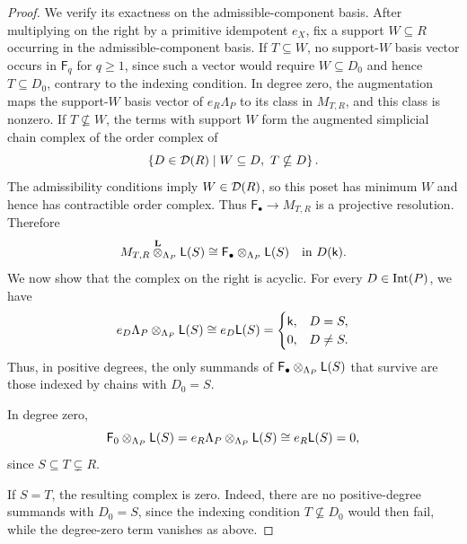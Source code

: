 \begin{proof}
We verify its exactness on the admissible-component basis.
After multiplying on the right by a primitive idempotent $e_X$, fix
a support $W\subseteq R$ occurring in the admissible-component basis.
If $T\subseteq W$, no support-$W$ basis vector occurs in
$\mathsf F_q$ for $q\geq1$, since such a vector would require
$W\subseteq D_0$ and hence $T\subseteq D_0$, contrary to the
indexing condition. 
In degree zero, the augmentation maps the support-$W$ basis vector of $e_R\Lambda_P$ to its class in $M_{T,R}$, and this class is nonzero.
If $T\nsubseteq W$, the terms with support $W$ form the augmented
simplicial chain complex of the order complex of
\[
\left\{
D\in\mathcal D(R)
\mid
W\subseteq D,\ T\nsubseteq D
\right\}.
\]
The admissibility conditions imply $W\in\mathcal D(R)$, so this poset has
minimum $W$ and hence has contractible order complex.
Thus $\mathsf F_\bullet\to M_{T,R}$ is a projective resolution.
Therefore
\begin{equation}
\label{eq:ss-cover-derived-tensor-resolution}
M_{T,R}
\overset{\mathbf L}{\otimes}_{\Lambda_P}\mathsf L(S)
\cong
\mathsf F_\bullet\otimes_{\Lambda_P}\mathsf L(S)
\quad\text{in }D(\mathsf{k}).
\end{equation}
We now show that the complex on the right is acyclic. 
For every $D\in\operatorname{Int}(P)$, we have
\[
e_D\Lambda_P\otimes_{\Lambda_P}\mathsf L(S)
\cong
e_D\mathsf L(S)
=
\begin{cases}
\mathsf{k}, & D=S,\\
0, & D\neq S.
\end{cases}
\]
Thus, in positive degrees, the only summands of
$\mathsf F_\bullet\otimes_{\Lambda_P}\mathsf L(S)$ that survive are those
indexed by chains with $D_0=S$.

In degree zero,
\[
\mathsf F_0\otimes_{\Lambda_P}\mathsf L(S)
=
e_R\Lambda_P\otimes_{\Lambda_P}\mathsf L(S)
\cong e_R\mathsf L(S)=0,
\]
since $S\subseteq T\subsetneq R$.

If $S=T$, the resulting complex is zero.  Indeed, there are no
positive-degree summands with $D_0=S$, since the indexing condition
$T\nsubseteq D_0$ would then fail, while the degree-zero term vanishes
as above.


\end{proof}
